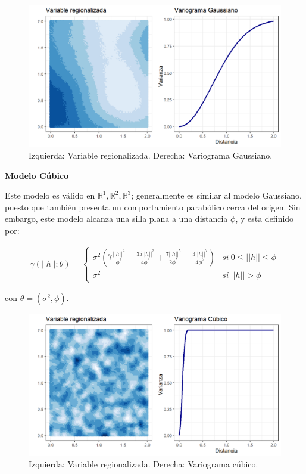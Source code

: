 \documentclass[
]{book}
\begin{document}
\begin{figure}
\includegraphics[width=17.78in]{figuras/otros/gau_var} \caption{Izquierda: Variable regionalizada. Derecha: Variograma Gaussiano.}\label{fig:gauvar}
\end{figure}

\textbf{Modelo Cúbico}

Este modelo es válido en \(\mathbb{R}^1,\mathbb{R}^2,\mathbb{R}^3\); generalmente es similar al modelo Gaussiano, puesto que también presenta un comportamiento parabólico cerca del origen. Sin embargo, este modelo alcanza una silla plana a una distancia \(\phi\), y esta definido por:

\begin{align*}
    \gamma(||h||;\theta)=\left \{ \begin{matrix} \sigma^2\left(7\frac{||h||^2}{\phi^2}-\frac{35||h||^3}{4\phi^3}+\frac{7||h||^5}{2\phi^5}-\frac{3||h||^7}{4\phi^7} \right) &  si \ 0\leq||h||\leq\phi\\
    \sigma^2 &  si\ ||h||>\phi \end{matrix}\right.
\end{align*}

con \(\theta=(\sigma^2,\phi)\).

\begin{figure}
\includegraphics[width=17.78in]{figuras/otros/cub_var} \caption{Izquierda: Variable regionalizada. Derecha: Variograma cúbico.}\label{fig:cubvar}
\end{figure}
\end{document}
